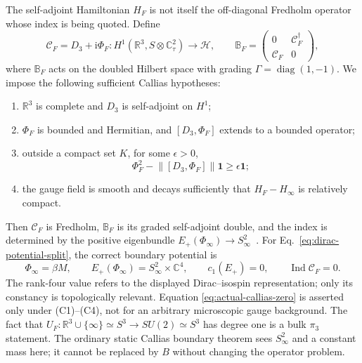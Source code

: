 \documentclass[11pt]{article}
\theoremstyle{definition}
\theoremstyle{remark}
\newcommand{\ii}{\mathrm i}
\newcommand{\CC}{\mathbb C}
\newcommand{\RR}{\mathbb R}
\newcommand{\cH}{\mathcal H}
\newcommand{\Ind}{\operatorname{Ind}}
\begin{document}
The self-adjoint Hamiltonian \(H_F\) is not itself the off-diagonal Fredholm
operator whose index is being quoted.  Define
\begin{equation}
 \mathscr C_F=D_3+\ii\Phi_F:
 H^1(\RR^3,S\otimes\CC^2_\tau)\longrightarrow\cH,
 \qquad
 \mathbb B_F=
 \begin{pmatrix}0&\mathscr C_F^\dagger\\
                 \mathscr C_F&0\end{pmatrix},
 \label{eq:callias}
\end{equation}
where \(\mathbb B_F\) acts on the doubled Hilbert space with grading
\(\Gamma=\operatorname{diag}(1,-1)\).  We impose the following sufficient
Callias hypotheses:
\begin{enumerate}[label=(C\arabic*)]
\item \(\RR^3\) is complete and \(D_3\) is self-adjoint on \(H^1\);
\item \(\Phi_F\) is bounded and Hermitian, and
  \([D_3,\Phi_F]\) extends to a bounded operator;
\item outside a compact set \(K\), for some \(\epsilon>0\),
  \begin{equation}
   \Phi_F^2-\lVert[D_3,\Phi_F]\rVert\bm1\ge\epsilon\bm1;
   \label{eq:callias-coercive}
  \end{equation}
\item the gauge field is smooth and decays sufficiently that
  \(H_F-H_\infty\) is relatively compact.
\end{enumerate}
Then \(\mathscr C_F\) is Fredholm, \(\mathbb B_F\) is its graded
self-adjoint double, and the index is determined by the positive
eigenbundle
\(E_+(\Phi_\infty)\to S^2_\infty\)~\cite{Callias1978APE6,VanDenDungen2025APE6}.
For Eq.~\eqref{eq:dirac-potential-split}, the correct boundary potential is
\begin{equation}
 \Phi_\infty=\beta M,
 \qquad E_+(\Phi_\infty)=S^2_\infty\times\CC^4,
 \qquad c_1(E_+)=0,
 \qquad \Ind\mathscr C_F=0.
 \label{eq:actual-callias-zero}
\end{equation}
The rank-four value refers to the displayed Dirac--isospin representation;
only its constancy is topologically relevant.  Equation
\eqref{eq:actual-callias-zero} is asserted only under (C1)--(C4), not for an
arbitrary microscopic gauge background.
The fact that \(U_F:\RR^3\cup\{\infty\}\simeq S^3\to SU(2)\simeq S^3\)
has degree one is a bulk \(\pi_3\) statement.  The ordinary static Callias
boundary theorem sees \(S^2_\infty\) and a constant mass here; it cannot be
replaced by \(B\) without changing the operator problem.
\end{document}
